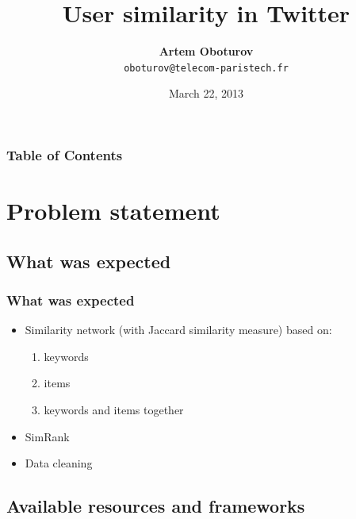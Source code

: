 \documentclass[handout]{beamer}
\title[User similarity in Twitter]{\bf User similarity in Twitter}
\author[A. Oboturov]{{\bf Artem Oboturov}\\ \texttt{oboturov@telecom-paristech.fr}}
\date{March 22, 2013}
\begin{document}

\begin{frame}
\titlepage
\end{frame}


\begin{frame}
\frametitle{\bf Table of Contents}
\tableofcontents
\end{frame}


\section{Problem statement}

\subsection{What was expected}


\begin{frame}
\frametitle{\bf What was expected}

\begin{itemize}
\item Similarity network (with Jaccard similarity measure) based on:
\begin{enumerate}
\item keywords
\item items
\item keywords and items together
\end{enumerate}
\item SimRank
\item Data cleaning
\end{itemize}

\end{frame}


\subsection{Available resources and frameworks}

\end{document}
